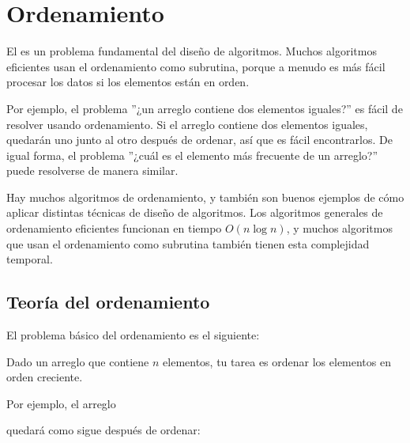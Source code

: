 \chapter{Ordenamiento}


El 
es un problema fundamental del diseño de algoritmos.
Muchos algoritmos eficientes
usan el ordenamiento como subrutina,
porque a menudo es más fácil procesar
los datos si los elementos están en orden.

Por ejemplo, el problema ''¿un arreglo contiene
dos elementos iguales?'' es fácil de resolver usando ordenamiento.
Si el arreglo contiene dos elementos iguales,
quedarán uno junto al otro después de ordenar,
así que es fácil encontrarlos.
De igual forma, el problema ''¿cuál es el elemento más frecuente
de un arreglo?'' puede resolverse de manera similar.

Hay muchos algoritmos de ordenamiento, y también son
buenos ejemplos de cómo aplicar
distintas técnicas de diseño de algoritmos.
Los algoritmos generales de ordenamiento eficientes
funcionan en tiempo $O(n \log n)$,
y muchos algoritmos que usan el ordenamiento
como subrutina también
tienen esta complejidad temporal.

\section{Teoría del ordenamiento}

El problema básico del ordenamiento es el siguiente:
\begin{framed}
\noindent
Dado un arreglo que contiene $n$ elementos,
tu tarea es ordenar los elementos
en orden creciente.
\end{framed}
\noindent
Por ejemplo, el arreglo
\begin{center}
\end{center}
quedará como sigue después de ordenar:
\begin{center}
\end{center}

